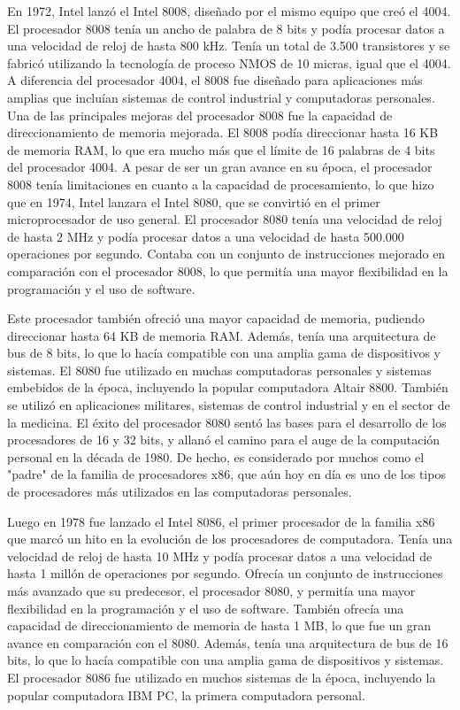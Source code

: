 \documentclass{article}
\begin{document}
En 1972, Intel lanzó el Intel 8008, diseñado por el mismo equipo que creó el 4004. El procesador 8008 tenía un ancho de palabra de 8 bits 
y podía procesar datos a una velocidad de reloj de hasta 800 kHz. Tenía un total de 3.500 transistores y se fabricó utilizando 
la tecnología de proceso NMOS de 10 micras, igual que el 4004. A diferencia del procesador 4004, el 8008 fue diseñado para aplicaciones 
más amplias que incluían sistemas de control industrial y computadoras personales.
Una de las principales mejoras del procesador 8008 fue la capacidad de direccionamiento de memoria mejorada. El 8008 podía direccionar 
hasta 16 KB de memoria RAM, lo que era mucho más que el límite de 16 palabras de 4 bits del procesador 4004.
A pesar de ser un gran avance en su época, el procesador 8008 tenía limitaciones en cuanto a la capacidad de procesamiento, 
lo que hizo que en 1974, Intel lanzara el Intel 8080, que se convirtió en el primer microprocesador de uso general. 
El procesador 8080 tenía una velocidad de reloj de hasta 2 MHz y podía procesar datos a una velocidad de hasta 500.000 
operaciones por segundo. Contaba con un conjunto de instrucciones mejorado en comparación con el procesador 8008, lo que permitía 
una mayor flexibilidad en la programación y el uso de software.

Este procesador también ofreció una mayor capacidad de memoria, pudiendo direccionar hasta 64 KB de memoria RAM. Además, 
tenía una arquitectura de bus de 8 bits, lo que lo hacía compatible con una amplia gama de dispositivos y sistemas.
El 8080 fue utilizado en muchas computadoras personales y sistemas embebidos de la época, incluyendo la popular computadora Altair 8800. 
También se utilizó en aplicaciones militares, sistemas de control industrial y en el sector de la medicina. El éxito del procesador 8080 
sentó las bases para el desarrollo de los procesadores de 16 y 32 bits, y allanó el camino para el auge de la computación personal en la década de 1980. 
De hecho, es considerado por muchos como el "padre" de la familia de procesadores x86, que aún hoy en día es uno de los tipos de procesadores 
más utilizados en las computadoras personales.

Luego en 1978 fue lanzado el Intel 8086, el primer procesador de la familia x86 que marcó un hito en la evolución de los procesadores de computadora. 
Tenía una velocidad de reloj de hasta 10 MHz y podía procesar datos a una velocidad de hasta 1 millón de operaciones por segundo. 
Ofrecía un conjunto de instrucciones más avanzado que su predecesor, el procesador 8080, y permitía una mayor flexibilidad en la programación y 
el uso de software. También ofrecía una capacidad de direccionamiento de memoria de hasta 1 MB, lo que fue un gran avance en comparación con el 8080. 
Además, tenía una arquitectura de bus de 16 bits, lo que lo hacía compatible con una amplia gama de dispositivos y sistemas.
El procesador 8086 fue utilizado en muchos sistemas de la época, incluyendo la popular computadora IBM PC, la primera computadora personal.
\end{document}
